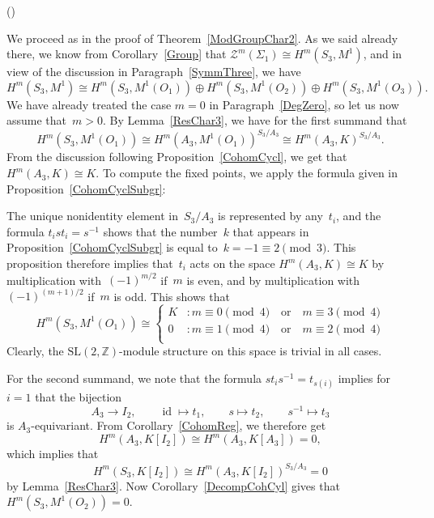 \documentclass[12pt]{article}
\makeatletter
\newcounter{num}
\newenvironment{pflist}{\begin{list}{(\arabic{num})}{\usecounter{num} \leftmargin0cm \itemindent5pt}}{\end{list}}
\theoremstyle{definition}
\theoremstyle{break}
\renewenvironment{proof}[1][\proofname]{\par
\vspace{-5pt}%
\pushQED{\qed}%
\normalfont
\topsep0pt \partopsep0pt %
\trivlist
\item[\hskip\labelsep
\bfseries
#1\@addpunct{.}]\ignorespaces
}{%
\popQED\endtrivlist\@endpefalse
\addvspace{6pt plus 6pt} %
}
\newcommand{\Z}{\mathbb{Z}}
\DeclareMathOperator\id{id}
\newcommand{\SL}{\mathrm{SL}}
\renewcommand{\1}{\mathbbm{1}}
\newcommand{\TFT}{\mathcal{Z}}
\makeatother
\begin{document}
\begin{proof}
\begin{pflist}
\item
We proceed as in the proof of Theorem~\ref{ModGroupChar2}. As we said already there, we know from Corollary~\ref{Group} that $\TFT^m(\Sigma_{1}) \cong H^m(S_3, M^1)$, and in view of the discussion in Paragraph~\ref{SymmThree}, we have
\[H^m(S_3, M^1) \cong H^m(S_3, M^1(O_1)) \oplus H^m(S_3, M^1(O_2)) \oplus H^m(S_3, M^1(O_3)).\]
We have already treated the case $m=0$ in Paragraph~\ref{DegZero}, so let us now assume that~\mbox{$m>0$}. By Lemma~\ref{ResChar3}, we have for the first summand that
\[H^m(S_3, M^1(O_1)) \cong H^m(A_3, M^1(O_1))^{S_3/A_3} \cong H^m(A_3, K)^{S_3/A_3}.\]
From the discussion following Proposition~\ref{CohomCycl}, we get
that~$H^m(A_3, K) \cong K$. To compute the fixed points, we apply the formula given in Proposition~\ref{CohomCyclSubgr}:

The unique nonidentity element in~$S_3/A_3$ is represented by any~$t_i$, and the formula
$t_i s t_i = s^{-1}$ shows that the number~$k$ that appears in Proposition~\ref{CohomCyclSubgr} is equal \mbox{to~$k = -1 \equiv 2 \pmod{3}$}. This proposition therefore implies that~$t_i$ acts on the space $H^m(A_3, K) \cong K$ by multiplication with~$(-1)^{m/2}$ if~$m$ is even, and by multiplication with~$(-1)^{(m+1)/2}$ if~$m$ is odd. This shows that
\[H^m(S_3, M^1(O_1)) \cong
\begin{cases}
K &: m \equiv 0 \pmod{4} \quad \text{or} \quad m \equiv 3 \pmod{4}\\
0 &: m \equiv 1 \pmod{4}  \quad \text{or} \quad m \equiv 2 \pmod{4}\\
\end{cases}\]
Clearly, the $\SL(2,\Z)$-module structure on this space is trivial in all cases.

\item
For the second summand, we note that the formula $s t_i s^{-1} = t_{s(i)}$ implies for $i=1$ that the bijection
\[A_3 \to I_2, \qquad \id \mapsto t_1, \qquad s \mapsto t_2, \qquad s^{-1} \mapsto t_3\]
is $A_3$-equivariant. From Corollary~\ref{CohomReg}, we therefore get
\[H^m(A_3, K[I_2]) \cong H^m(A_3, K[A_3]) = 0,\]
which implies that
\[H^m(S_3, K[I_2]) \cong H^m(A_3, K[I_2])^{S_3/A_3} = 0\]
by Lemma~\ref{ResChar3}. Now Corollary~\ref{DecompCohCyl} gives that
$H^m(S_3, M^1(O_2)) = 0$.


\end{pflist}
\end{proof}
\end{document}
